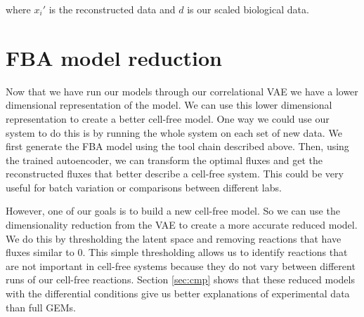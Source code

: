 where $x_i'$ is the reconstructed data and $d$ is our scaled biological data.

\section{FBA model reduction}
Now that we have run our models through our correlational VAE we have a lower dimensional representation of the model.
We can use this lower dimensional representation to create a better cell-free model.
One way we could use our system to do this is by running the whole system on each set of new data.
We first generate the FBA model using the tool chain described above.
Then, using the trained autoencoder, we can transform the optimal fluxes and get the reconstructed fluxes that better describe a cell-free system.
This could be very useful for batch variation or comparisons between different labs.

However, one of our goals is to build a new cell-free model.
So we can use the dimensionality reduction from the VAE  to create a more accurate reduced model.
We do this by thresholding the latent space and removing reactions that have fluxes similar to 0.
This simple thresholding allows us to identify reactions that are not important in cell-free systems because they do not vary between different runs of our cell-free reactions.
Section \ref{sec:cmp} shows that these reduced models with the differential conditions give us better explanations of experimental data than full GEMs.

